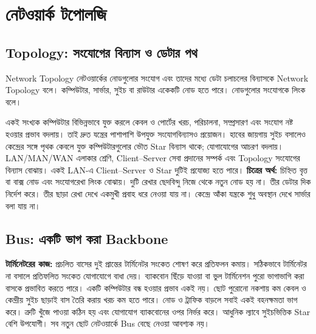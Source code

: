 \begingroup
\chTwoReadableTopicStyle
{}
\section{নেটওয়ার্ক টপোলজি}
\subsection{Topology: সংযোগের বিন্যাস ও ডেটার পথ}
\label{ch2:c09-01}
\begin{definitionbox}{Network Topology}
নেটওয়ার্কের নোডগুলোর সংযোগ এবং তাদের মধ্যে ডেটা চলাচলের বিন্যাসকে Network Topology বলে। কম্পিউটার, সার্ভার, সুইচ বা রাউটার একেকটি নোড হতে পারে। নোডগুলোর সংযোগকে লিংক বলে।
\end{definitionbox}
একই সংখ্যক কম্পিউটার বিভিন্নভাবে যুক্ত করলে কেবল ও পোর্টের খরচ, পরিচালনা, সম্প্রসারণ এবং সংযোগ নষ্ট হওয়ার প্রভাব বদলায়। তাই দ্রুত যন্ত্রের পাশাপাশি উপযুক্ত সংযোগবিন্যাসও প্রয়োজন।
হাবের জায়গায় সুইচ বসালেও কেন্দ্রের সঙ্গে পৃথক কেবলে যুক্ত কম্পিউটারগুলোর ভৌত Star বিন্যাস থাকে; যোগাযোগের আচরণ বদলায়। LAN/MAN/WAN এলাকার শ্রেণি, Client–Server সেবা প্রদানের সম্পর্ক এবং Topology সংযোগের বিন্যাস বোঝায়। একই LAN-এ Client–Server ও Star দুটিই প্রযোজ্য হতে পারে।
\textbf{চিত্রের অর্থ:} চিহ্নিত বৃত্ত বা বাক্স নোড এবং সংযোগরেখা লিংক বোঝায়। দুটি রেখার ছেদবিন্দু নিজে থেকে নতুন নোড হয় না। তীর ডেটার দিক নির্দেশ করে। তীর ছাড়া রেখা দেখে একমুখী প্রবাহ ধরে নেওয়া যায় না। কেন্দ্রে আঁকা যন্ত্রকে শুধু অবস্থান দেখে সার্ভার বলা যায় না।

\subsection{Bus: একটি ভাগ করা Backbone}
\label{ch2:c09-02}
\textbf{টার্মিনেটরের কাজ:} প্রচলিত বাসের দুই প্রান্তের টার্মিনেটর সংকেত শোষণ করে প্রতিফলন কমায়। সঠিকভাবে টার্মিনেটর না বসালে প্রতিফলিত সংকেত যোগাযোগে বাধা দেয়। ব্যাকবোন ছিঁড়ে যাওয়া বা ভুল টার্মিনেশন পুরো ভাগাভাগি করা বাসকে প্রভাবিত করতে পারে। একটি কম্পিউটার বন্ধ হওয়ার প্রভাব একই নয়।
ছোট পুরোনো নকশায় কম কেবল ও কেন্দ্রীয় সুইচ ছাড়াই বাস তৈরি করায় খরচ কম হতে পারে। নোড ও ট্রাফিক বাড়লে সবাই একই বহনক্ষমতা ভাগ করে। ত্রুটি খুঁজে পাওয়া কঠিন হয় এবং যোগাযোগ ব্যাকবোনের ওপর নির্ভর করে। আধুনিক ল্যাবে সুইচভিত্তিক Star বেশি উপযোগী। সব নতুন ছোট নেটওয়ার্কে Bus বেছে নেওয়া আবশ্যক নয়।

